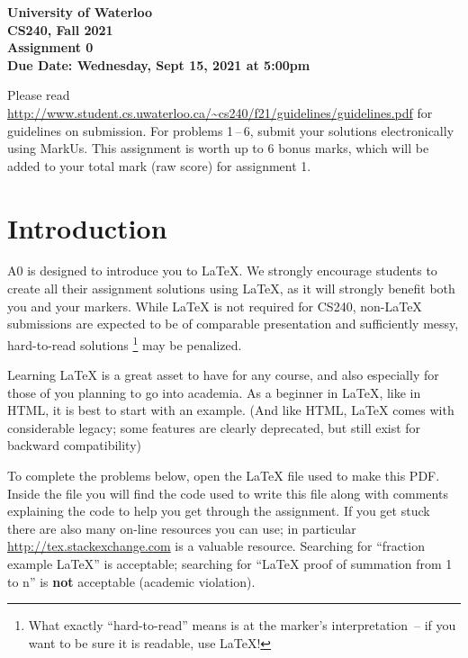 \documentclass[12pt]{article}
\begin{document}
	
	\begin{center}
		{\Large\textbf{University of Waterloo}}\\
		\vspace{3mm}
		{\Large\textbf{CS240, Fall 2021}}\\
		\vspace{2mm}
		{\Large\textbf{Assignment 0}}\\
		\vspace{3mm}
		\textbf{Due Date: Wednesday, Sept 15, 2021 at 5:00pm}
	\end{center}
	
	Please read
	\url{http://www.student.cs.uwaterloo.ca/~cs240/f21/guidelines/guidelines.pdf}
	for guidelines on submission.  For problems 1\,--\,6, submit your
	solutions electronically using MarkUs.
	This assignment is worth up to 6 bonus marks, which will be added to
	your total mark (raw score) for assignment 1.
	
	
	\section*{Introduction}
	
	A0 is designed to introduce you to \LaTeX.
	We strongly encourage students to create all their assignment solutions using \LaTeX,
	as it will strongly benefit both you and your markers. While \LaTeX{} is not required for CS240,
	non-\LaTeX{} submissions are expected to be of comparable presentation and sufficiently
	messy, hard-to-read solutions%
	\footnote{%
		What exactly ``hard-to-read'' means is at the marker's interpretation~-- 
		if you want to be sure it is readable, use \LaTeX!%
	} 
	may be penalized. 
	
	
	Learning \LaTeX{} is a great asset 
	to have for any course, and also especially for those of you planning to go into academia.
	As a beginner in \LaTeX, like in HTML, it is best to start with an example. 
	(And like HTML, \LaTeX{} comes with considerable legacy; some features are clearly deprecated,
	but still exist for backward compatibility)
	
	To complete the problems below, open the 
	\LaTeX{} file used to make this PDF. Inside the file you will find the code used to write this
	file along with comments explaining the code to help you get through the assignment. If you get
	stuck there are also many on-line resources you can use;
	in particular \url{http://tex.stackexchange.com} is a valuable resource.
	Searching for ``fraction example \LaTeX'' 
	is acceptable; searching for ``\LaTeX{} proof of summation from 1 to n'' 
	is \textbf{not} acceptable (academic violation). 
	
\end{document}
